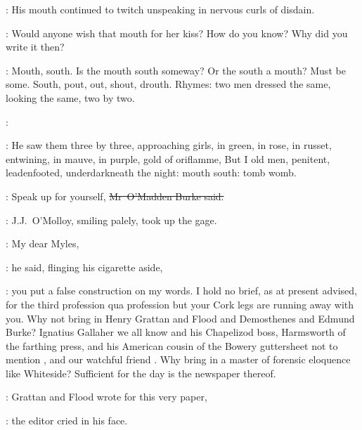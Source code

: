 :
His mouth continued to twitch unspeaking
in nervous curls of disdain.

\StephenInt:
Would anyone wish that mouth for her kiss?
How do you know?
Why did you write it then?



\StephenInt:
Mouth, south.
Is the mouth south someway?
Or the south a mouth?
Must be some.
South,
pout,
out,
shout,
drouth.
Rhymes:
two men dressed the same,
looking the same,
two by two.

\StephenInt:

\StephenInt:
He saw them three by three,
approaching girls,
in green,
in rose,
in russet,
entwining,
in mauve,
in purple,
gold of oriflamme,
But I old men,
penitent,
leadenfooted,
underdarkneath the night:
mouth south:
tomb womb.

\omaddenburke:
Speak up for yourself,
\sout{Mr~O'Madden Burke said.}



:
J.J.~O'Molloy,
smiling palely,
took up the gage.

\jjom:
My dear Myles,

:
he said,
flinging his cigarette aside,

\jjom:
you put a false construction on my words.
I hold no brief,
as at present advised,
for the third profession qua profession
but your Cork legs are running away with you.
Why not bring in Henry Grattan and Flood and Demosthenes and Edmund Burke?
Ignatius Gallaher we all know
and his Chapelizod boss, Harmsworth of the farthing press,
and his American cousin of the Bowery guttersheet
not to mention ,
and our watchful friend .
Why bring in a master of forensic eloquence like Whiteside?
Sufficient for the day is the newspaper thereof.



\crawford:
Grattan and Flood wrote for this very paper,

:
the editor cried in his face.

